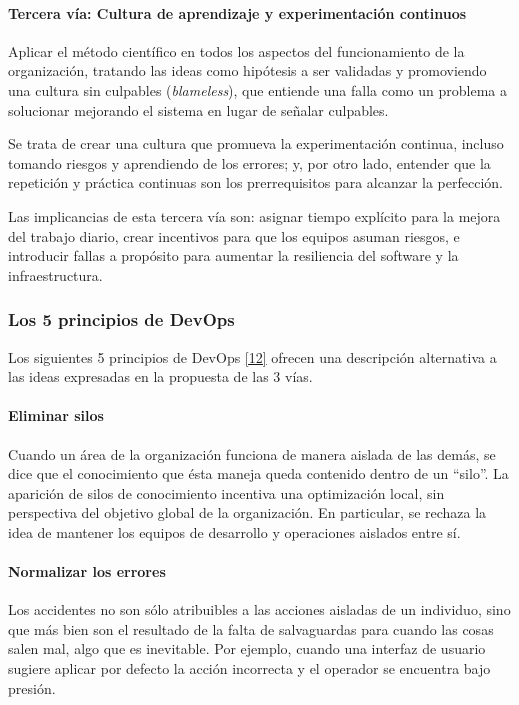 \paragraph{Tercera vía: Cultura de aprendizaje y experimentación continuos}

Aplicar el método científico en todos los aspectos del funcionamiento de la organización, tratando las ideas como hipótesis a ser validadas y promoviendo una cultura sin culpables (\textit{blameless}), que entiende una falla como un problema a solucionar mejorando el sistema en lugar de señalar culpables.

Se trata de crear una cultura que promueva la experimentación continua, incluso tomando riesgos y aprendiendo de los errores; y, por otro lado, entender que la repetición y práctica continuas son los prerrequisitos para alcanzar la perfección.

Las implicancias de esta tercera vía son: asignar tiempo explícito para la mejora del trabajo diario, crear incentivos para que los equipos asuman riesgos, e introducir fallas a propósito para aumentar la resiliencia del software y la infraestructura.

\subsubsection{Los 5 principios de DevOps}

Los siguientes 5 principios de DevOps \href{https://www.zotero.org/google-docs/?kUyWcC}{[12]} ofrecen una descripción alternativa a las ideas expresadas en la propuesta de las 3 vías. 

\paragraph{Eliminar silos}

Cuando un área de la organización funciona de manera aislada de las demás, se dice que el conocimiento que ésta maneja queda contenido dentro de un “silo”. La aparición de silos de conocimiento incentiva una optimización local, sin perspectiva del objetivo global de la organización. En particular, se rechaza la idea de mantener los equipos de desarrollo y operaciones aislados entre sí.

\paragraph{Normalizar los errores}

Los accidentes no son sólo atribuibles a las acciones aisladas de un individuo, sino que más bien son el resultado de la falta de salvaguardas para cuando las cosas salen mal, algo que es inevitable. Por ejemplo, cuando una interfaz de usuario sugiere aplicar por defecto la acción incorrecta y el operador se encuentra bajo presión.

